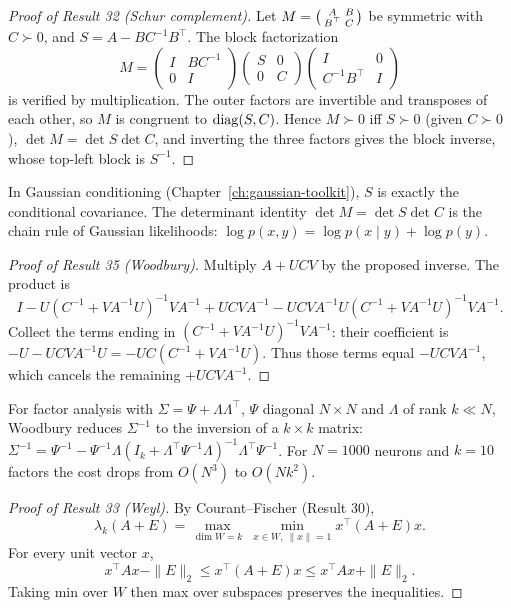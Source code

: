 \begin{proof}[Proof of Result 32 (Schur complement)]
Let $M=\begin{psmallmatrix}A&B\\B^\top&C\end{psmallmatrix}$ be symmetric
with $C\succ0$, and $S=A-BC^{-1}B^\top$. The block factorization
\[
M=\begin{pmatrix}I&BC^{-1}\\0&I\end{pmatrix}
\begin{pmatrix}S&0\\0&C\end{pmatrix}
\begin{pmatrix}I&0\\C^{-1}B^\top&I\end{pmatrix}
\]
is verified by multiplication. The outer factors are invertible and
transposes of each other, so $M$ is congruent to $\operatorname{diag}(S,C)$.
Hence $M\succ0$ iff $S\succ0$ (given $C\succ0$), $\det M=\det S\det C$,
and inverting the three factors gives the block inverse, whose top-left
block is $S^{-1}$.
\end{proof}
In Gaussian conditioning (Chapter~\ref{ch:gaussian-toolkit}), $S$ is
exactly the conditional covariance. The determinant identity
$\det M=\det S\det C$ is the chain rule of Gaussian likelihoods:
$\log p(x,y)=\log p(x\mid y)+\log p(y)$.

\begin{proof}[Proof of Result 35 (Woodbury)]
Multiply $A+UCV$ by the proposed inverse. The product is
\[
I-U(C^{-1}+VA^{-1}U)^{-1}VA^{-1}+UCVA^{-1}-UCVA^{-1}U(C^{-1}+VA^{-1}U)^{-1}VA^{-1}.
\]
Collect the terms ending in $(C^{-1}+VA^{-1}U)^{-1}VA^{-1}$:
their coefficient is $-U-UCVA^{-1}U=-UC(C^{-1}+VA^{-1}U)$. Thus those
terms equal $-UCVA^{-1}$, which cancels the remaining $+UCVA^{-1}$.
\end{proof}
For factor analysis with $\Sigma=\Psi+\Lambda\Lambda^\top$, $\Psi$
diagonal $N\times N$ and $\Lambda$ of rank $k\ll N$, Woodbury reduces
$\Sigma^{-1}$ to the inversion of a $k\times k$ matrix:
$\Sigma^{-1}=\Psi^{-1}-\Psi^{-1}\Lambda(I_k+\Lambda^\top\Psi^{-1}\Lambda)^{-1}\Lambda^\top\Psi^{-1}$.
For $N=1000$ neurons and $k=10$ factors the cost drops from $O(N^3)$
to $O(Nk^2)$.

\begin{proof}[Proof of Result 33 (Weyl)]
By Courant--Fischer (Result 30),
\[
\lambda_k(A+E)=\max_{\dim W=k}\ \min_{x\in W,\ \|x\|=1}x^\top(A+E)x.
\]
For every unit vector $x$,
\[
x^\top Ax-\|E\|_2\le x^\top(A+E)x\le x^\top Ax+\|E\|_2.
\]
Taking min over $W$ then max over subspaces preserves the inequalities.
\end{proof}

